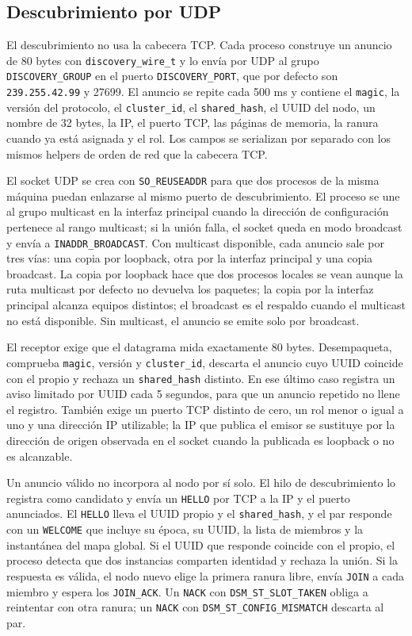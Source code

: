 \subsection{Descubrimiento por UDP}

El descubrimiento no usa la cabecera TCP. Cada proceso construye un anuncio de 80 bytes con \texttt{discovery\_wire\_t} y lo envía por UDP al grupo \texttt{DISCOVERY\_GROUP} en el puerto \texttt{DISCOVERY\_PORT}, que por defecto son \texttt{239.255.42.99} y 27699. El anuncio se repite cada 500 ms y contiene el \texttt{magic}, la versión del protocolo, el \texttt{cluster\_id}, el \texttt{shared\_hash}, el UUID del nodo, un nombre de 32 bytes, la IP, el puerto TCP, las páginas de memoria, la ranura cuando ya está asignada y el rol. Los campos se serializan por separado con los mismos helpers de orden de red que la cabecera TCP.

El socket UDP se crea con \texttt{SO\_REUSEADDR} para que dos procesos de la misma máquina puedan enlazarse al mismo puerto de descubrimiento. El proceso se une al grupo multicast en la interfaz principal cuando la dirección de configuración pertenece al rango multicast; si la unión falla, el socket queda en modo broadcast y envía a \texttt{INADDR\_BROADCAST}. Con multicast disponible, cada anuncio sale por tres vías: una copia por loopback, otra por la interfaz principal y una copia broadcast. La copia por loopback hace que dos procesos locales se vean aunque la ruta multicast por defecto no devuelva los paquetes; la copia por la interfaz principal alcanza equipos distintos; el broadcast es el respaldo cuando el multicast no está disponible. Sin multicast, el anuncio se emite solo por broadcast.

El receptor exige que el datagrama mida exactamente 80 bytes. Desempaqueta, comprueba \texttt{magic}, versión y \texttt{cluster\_id}, descarta el anuncio cuyo UUID coincide con el propio y rechaza un \texttt{shared\_hash} distinto. En ese último caso registra un aviso limitado por UUID cada 5 segundos, para que un anuncio repetido no llene el registro. También exige un puerto TCP distinto de cero, un rol menor o igual a uno y una dirección IP utilizable; la IP que publica el emisor se sustituye por la dirección de origen observada en el socket cuando la publicada es loopback o no es alcanzable.

Un anuncio válido no incorpora al nodo por sí solo. El hilo de descubrimiento lo registra como candidato y envía un \texttt{HELLO} por TCP a la IP y el puerto anunciados. El \texttt{HELLO} lleva el UUID propio y el \texttt{shared\_hash}, y el par responde con un \texttt{WELCOME} que incluye su época, su UUID, la lista de miembros y la instantánea del mapa global. Si el UUID que responde coincide con el propio, el proceso detecta que dos instancias comparten identidad y rechaza la unión. Si la respuesta es válida, el nodo nuevo elige la primera ranura libre, envía \texttt{JOIN} a cada miembro y espera los \texttt{JOIN\_ACK}. Un \texttt{NACK} con \texttt{DSM\_ST\_SLOT\_TAKEN} obliga a reintentar con otra ranura; un \texttt{NACK} con \texttt{DSM\_ST\_CONFIG\_MISMATCH} descarta al par.

